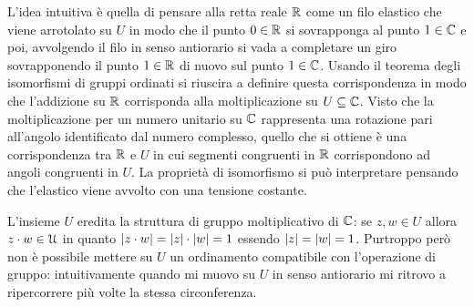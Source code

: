 L'idea intuitiva è quella di pensare alla retta reale ${\mathbb R}$ come un filo 
elastico che viene arrotolato su $U$ in modo che il punto $0\in {\mathbb R}$ 
si sovrapponga al punto $1\in {\mathbb C}$ e poi, avvolgendo il filo in senso antiorario 
si vada a completare un giro sovrapponendo il punto $1\in {\mathbb R}$ di nuovo sul punto 
$1\in {\mathbb C}$. 
Usando il teorema degli isomorfismi di gruppi ordinati si riuscira a definire 
questa corrispondenza in modo che l'addizione su ${\mathbb R}$ corrisponda alla moltiplicazione 
su $U\subseteq {\mathbb C}$. 
Visto che la moltiplicazione per un numero unitario su ${\mathbb C}$ rappresenta 
una rotazione pari all'angolo identificato dal numero complesso, 
quello che si ottiene è una corrispondenza tra ${\mathbb R}$ e $U$ in cui 
segmenti congruenti in ${\mathbb R}$ corrispondono ad angoli congruenti in $U$.
La proprietà di isomorfismo si può interpretare pensando che l'elastico 
viene avvolto con una tensione costante. 

L'insieme $U$ eredita la struttura di gruppo moltiplicativo di ${\mathbb C}$: se $z,w\in U$ 
allora $z\cdot w \in \mathcal U$ in quanto ${\left|z\cdot w\right|} = {\left|z\right|}\cdot {\left|w\right|} = 1$
essendo ${\left|z\right|}={\left|w\right|}=1$. Purtroppo però non è possibile mettere su $U$ 
un ordinamento compatibile con l'operazione di gruppo: intuitivamente 
quando mi muovo su $U$ in senso antiorario mi ritrovo a ripercorrere più volte 
la stessa circonferenza.

